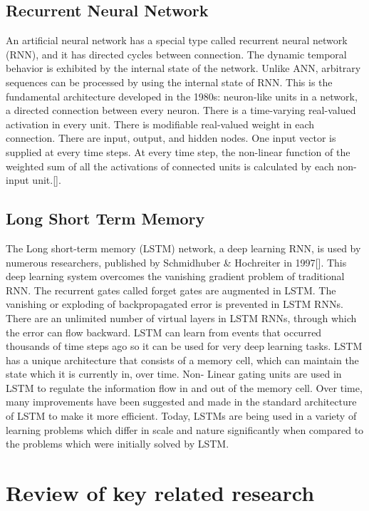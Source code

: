 \documentclass[12pt,a4paper]{article}
\begin{document}
\subsection{Recurrent Neural Network}
An artificial neural network has a special type called recurrent neural network (RNN), and
it has directed cycles between connection. The dynamic temporal behavior is exhibited by the internal
state of the network. Unlike ANN, arbitrary sequences can be processed by using the internal state
of RNN. This is the fundamental architecture developed in the 1980s: neuron-like units in a network, a directed
connection between every neuron. There is a time-varying real-valued activation in every unit.
There is modifiable real-valued weight in each connection. There are input, output, and hidden
nodes. One input vector is supplied at every time steps. At every time step, the non-linear function
of the weighted sum of all the activations of connected units is calculated by each non-input unit.[].
\subsection{Long Short Term Memory}
The Long short-term memory (LSTM) network, a deep learning RNN, is used by numerous researchers, published by Schmidhuber \& Hochreiter in 1997[]. This deep learning system overcomes the vanishing gradient problem of traditional RNN. The recurrent gates called forget gates are augmented in LSTM. The vanishing or exploding of backpropagated error is prevented in LSTM RNNs. There are an unlimited number of virtual layers in LSTM RNNs, through which the error can flow backward. LSTM can learn from events that occurred thousands of time steps ago
so it can be used for very deep learning tasks. LSTM has a unique architecture that consists of
a memory cell, which can maintain the state which it is currently in, over time. Non- Linear
gating units are used in LSTM to regulate the information flow in and out of the memory cell. Over
time, many improvements have been suggested and made in the standard architecture of LSTM
to make it more efficient. Today, LSTMs are being used in a variety of learning problems
which differ in scale and nature significantly when compared to the problems which were initially
solved by LSTM.

\newpage
\section{Review of key related research}
\end{document}
